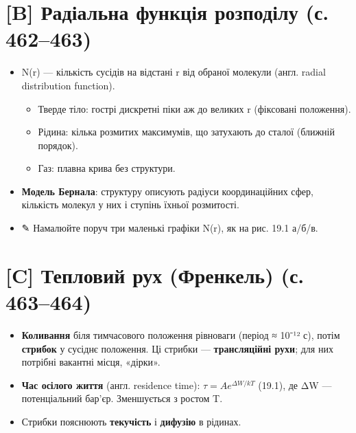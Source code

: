 \documentclass[11pt,a4paper,oneside]{book}
\newcommand{\pen}{{\sffamily\color{accent}✎}}
\begin{document}
\section*{[B] Радіальна функція розподілу (с. 462–463)}
\begin{itemize}
\item N(r) — кількість сусідів на відстані r від обраної молекули (англ. radial distribution function).
\begin{itemize}
\item Тверде тіло: гострі дискретні піки аж до великих r (фіксовані положення).
\item Рідина: кілька розмитих максимумів, що затухають до сталої (ближній порядок).
\item Газ: плавна крива без структури.
\end{itemize}
\item \textbf{Модель Бернала}: структуру описують радіуси координаційних сфер, кількість молекул у них і ступінь їхньої розмитості.
\item \pen{} Намалюйте поруч три маленькі графіки N(r), як на рис. 19.1 а/б/в.
\end{itemize}

\section*{[C] Тепловий рух (Френкель) (с. 463–464)}
\begin{itemize}
\item \textbf{Коливання} біля тимчасового положення рівноваги (період ≈ 10⁻¹² с), потім \textbf{стрибок} у сусіднє положення. Ці стрибки — \textbf{трансляційні рухи}; для них потрібні вакантні місця, «дірки».
\item \textbf{Час осілого життя} (англ. residence time): $\tau = Ae^{\Delta W/kT}$ (19.1), де ΔW — потенціальний бар'єр. Зменшується з ростом T.
\item Стрибки пояснюють \textbf{текучість} і \textbf{дифузію} в рідинах.
\end{itemize}
\end{document}
